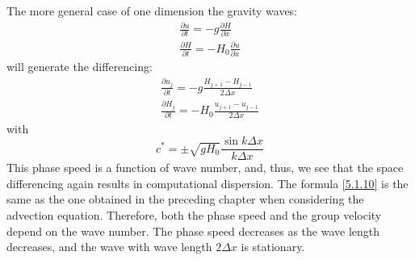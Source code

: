 The more general case of one dimension the gravity waves:
\begin{align*}
	\frac{\partial u}{\partial t}=-g\frac{\partial H}{\partial x} \\
	\frac{\partial H}{\partial t}=-H_0\frac{\partial u}{\partial x}
\end{align*}
will generate the differencing:
\begin{align}\label{5.1.6}
	\frac{\partial u_j}{\partial t}=-g\frac{H_{j+1}-H_{j-1}}{2\Delta x} \\
	\frac{\partial H_j}{\partial t}=-H_0\frac{u_{j+1}-u_{j-1}}{2\Delta x}
\end{align}
with \begin{equation}\label{5.1.10}
	c^*=\pm\sqrt{gH_0}\frac{\sin k\Delta x}{k\Delta x}
\end{equation}
This phase speed is a function of wave number, and, thus, we see that the space differencing again results in computational dispersion. The formula \ref{5.1.10} is the same as the one obtained in the preceding chapter when considering the advection equation. Therefore, both the phase speed and the group velocity depend on the wave number. The phase speed decreases as the wave length decreases, and the wave with wave length
$2\Delta x$ is stationary.


